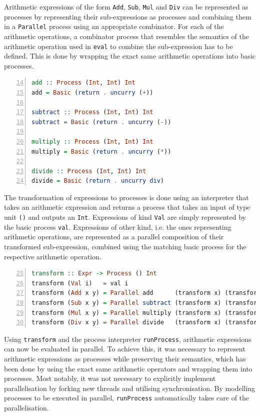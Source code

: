 Arithmetic expressions of the form \texttt{Add}, \texttt{Sub}, \texttt{Mul} and \texttt{Div} can be represented as processes by representing their sub-expressions as processes and combining them in a \texttt{Parallel} process using an appropriate combinator.  For each of the arithmetic operations, a combinator process that resembles the semantics of the arithmetic operation used in \texttt{eval} to combine the sub-expression has to be defined. This is done by wrapping the exact same arithmetic operations into basic processes.
\begin{lstlisting}[language=Haskell, caption=Basic processes for the combination of results from processes that have been executed in parallel., label=lst:arith_combinators,numbers=left, frame=bt, firstnumber=14]
add :: Process (Int, Int) Int
add = Basic (return . uncurry (+))

subtract :: Process (Int, Int) Int
subtract = Basic (return . uncurry (-))

multiply :: Process (Int, Int) Int
multiply = Basic (return . uncurry (*))

divide :: Process (Int, Int) Int
divide = Basic (return . uncurry div)
\end{lstlisting}

The transformation of expressions to processes is done using an interpreter \cite{Gamma:1995:DPE:186897} that takes an arithmetic expression and returns a process that takes an input of type unit \texttt{()} and outputs an \texttt{Int}. Expressions of kind \texttt{Val} are simply represented by the basic process \texttt{val}. Expressions of other kind, i.e. the ones representing arithmetic operations, are represented as a parallel composition of their transformed sub-expression, combined using the matching basic process for the respective arithmetic operation.
\begin{lstlisting}[language=Haskell, caption=Transformation from arithmetic expressions to processes., label=lst:arith_transformation, numbers=left, frame=bt, firstnumber=25, basicstyle=\footnotesize\ttfamily]
transform :: Expr -> Process () Int
transform (Val i)   = val i
transform (Add x y) = Parallel add      (transform x) (transform y)
transform (Sub x y) = Parallel subtract (transform x) (transform y)
transform (Mul x y) = Parallel multiply (transform x) (transform y)
transform (Div x y) = Parallel divide   (transform x) (transform y)
\end{lstlisting}

Using \texttt{transform} and the process interpreter \texttt{runProcess}, arithmetic expressions can now be evaluated in parallel. To achieve this, it was necessary to represent arithmetic expressions as processes while preserving their semantics, which has been done by using the exact same arithmetic operators and wrapping them into processes. Most notably, it was not necessary to explicitly implement parallelisation by forking new threads and utilising synchronisation. By modelling processes to be executed in parallel, \texttt{runProcess} automatically takes care of the parallelisation.